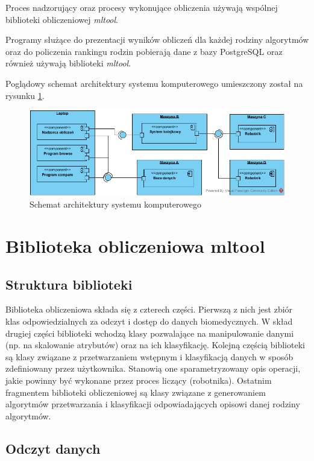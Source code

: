 \documentclass[../thesis.tex]{subfiles}
\begin{document}
Proces nadzorujący oraz procesy wykonujące obliczenia używają wspólnej biblioteki obliczeniowej \emph{mltool}. 

Programy służące do prezentacji wyników obliczeń dla każdej rodziny algorytmów oraz do policzenia rankingu rodzin pobierają dane z bazy PostgreSQL oraz również używają biblioteki \emph{mltool}.

Poglądowy schemat architektury systemu komputerowego umieszczony został na rysunku \ref{proj:arch_diagram}.

\begin{figure}[h]
\centering
\includegraphics[width=\textwidth]{arch.png}
\caption{Schemat architektury systemu komputerowego}
\label{proj:arch_diagram}
\end{figure}

\section{Biblioteka obliczeniowa mltool}

\subsection{Struktura biblioteki}
\label{proj:sec_structure}

Biblioteka obliczeniowa składa się z czterech części. Pierwszą z nich jest zbiór klas odpowiedzialnych za odczyt i dostęp do danych biomedycznych. W skład drugiej części biblioteki wchodzą klasy pozwalające na manipulowanie danymi (np. na skalowanie atrybutów) oraz na ich klasyfikację. Kolejną częścią biblioteki są klasy związane z przetwarzaniem wstępnym i klasyfikacją danych w sposób zdefiniowany przez użytkownika. Stanowią one sparametryzowany opis operacji, jakie powinny być wykonane przez proces liczący (robotnika). Ostatnim fragmentem biblioteki obliczeniowej są klasy związane z generowaniem algorytmów przetwarzania i klasyfikacji odpowiadających opisowi danej rodziny algorytmów.

\subsection{Odczyt danych}
\end{document}
